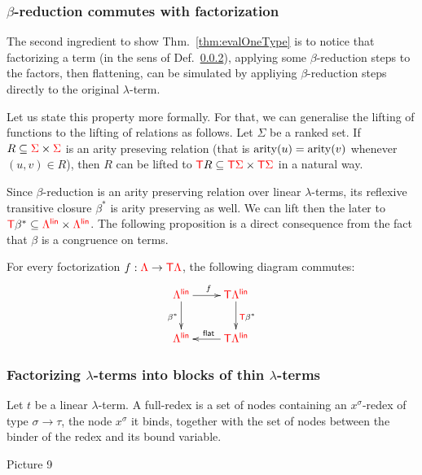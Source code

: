 \subsubsection{$\beta$-reduction commutes with factorization} The second ingredient to show Thm.~\ref{thm:evalOneType} is to notice  that factorizing a term (in the sens of Def.~\ref{}), applying some $\beta$-reduction steps to the factors, then flattening, can be simulated by appliying  $\beta$-reduction steps directly to the original $\lambda$-term.

Let us state this property more formally. For that, we can generalise the lifting of functions to the lifting of relations as follows. 
Let $\Sigma$ be a ranked set. If $R\subseteq {\color{red}{\Sigma}}\times{\color{red}{\Sigma}}$ is an arity preseving relation (that is $\mathrm{arity}(u)=\mathrm{arity}(v)$ whenever $(u,v)\in R$), then $R$ can be lifted to ${\color{red}{\mathsf T}} R\subseteq {\color{red}{{\color{red}{\mathsf T}}\Sigma}} \times {\color{red}{{\color{red}{\mathsf T}}\Sigma}}$ in a natural way. 

Since $\beta$-reduction is an arity preserving relation  over linear $\lambda$-terms, its reflexive transitive closure $\beta^*$ is arity preserving as well.  We can lift then the later to ${\color{red}{\mathsf T}} \beta^*\subseteq {\color{red}{\Lambda^{\sf{lin}}}}\times{\color{red}{\Lambda^{\sf{lin}}}}$.
The following proposition is a direct consequence from the fact that $\beta$ is a congruence on terms.
  
\begin{proposition}\label{prop:betaCommutesWithFacto}
For every foctorization $f:{\color{red}{\Lambda}} \to {\color{red}{\mathsf T}} {\color{red}{\Lambda}}$, the following diagram commutes:
\begin{align*}
        \xymatrix{
     \rlambdalin \ar[d]_{\beta^*}\ar[r]^f& \tmonad \rlambdalin \ar[d]^{\tmonad\beta^*} \\
           \rlambdalin  &\ar[l]_{\sf{flat}} \tmonad \rlambdalin
        }
        \end{align*}
\end{proposition}



\subsubsection{Factorizing $\lambda$-terms into blocks of thin $\lambda$-terms}

\begin{definition}
Let $t$ be a linear $\lambda$-term. A full-redex is a set of nodes  containing an $x^\sigma$-redex of type $\sigma\rightarrow\tau$, the node $x^\sigma$ it binds, together with the set of nodes between the binder of the redex and its bound variable.  
\end{definition}
\begin{center}
Picture 9
\end{center}



